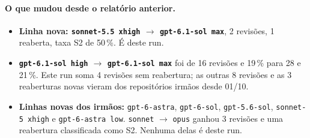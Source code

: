 \documentclass[11pt,a4paper]{article}
\begin{document}
\medskip
{}

\paragraph{O que mudou desde o relatório anterior.}
\begin{itemize}
  \item \textbf{Linha nova: \texttt{sonnet-5.5 xhigh} $\to$
        \texttt{gpt-6.1-sol max}}, 2 revisões, 1 reaberta, taxa S2 de 50\,\%.
        É deste run.
  \item \textbf{\texttt{gpt-6.1-sol high} $\to$ \texttt{gpt-6.1-sol max}} foi
        de 16 revisões e 19\,\% para 28 e 21\,\%. Este run soma 4 revisões sem
        reabertura; as outras 8 revisões e as 3 reaberturas novas vieram dos
        repositórios irmãos desde 01/10.
  \item \textbf{Linhas novas dos irmãos:} \texttt{gpt-6-astra},
        \texttt{gpt-6-sol}, \texttt{gpt-5.6-sol}, \texttt{sonnet-5 xhigh} e
        \texttt{gpt-6-astra low}. \texttt{sonnet} $\to$ \texttt{opus} ganhou 3
        revisões e uma reabertura classificada como S2. Nenhuma delas é deste
        run.
\end{itemize}
\end{document}
